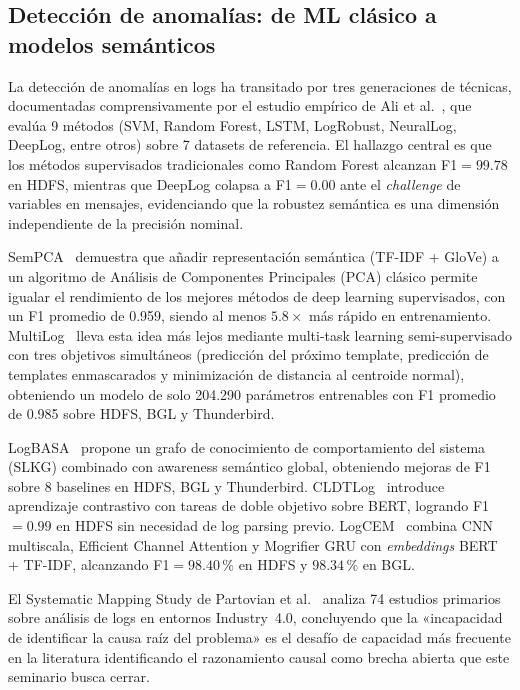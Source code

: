 \subsection{Detección de anomalías: de ML clásico a modelos semánticos}

La detección de anomalías en logs ha transitado por tres generaciones
de técnicas, documentadas comprensivamente por el estudio empírico de
Ali et al.~\cite{ali2025mlstudy}, que evalúa 9 métodos (SVM, Random Forest,
LSTM, LogRobust, NeuralLog, DeepLog, entre otros) sobre 7 datasets de
referencia. El hallazgo central es que los métodos supervisados
tradicionales como Random Forest alcanzan F1$=99.78$ en HDFS, mientras
que DeepLog colapsa a F1$=0.00$ ante el \textit{challenge} de variables en
mensajes, evidenciando que la robustez semántica es una dimensión
independiente de la precisión nominal.

SemPCA~\cite{yang2024sempca} demuestra que añadir representación
semántica (TF-IDF + GloVe) a un algoritmo de Análisis de Componentes Principales (PCA) clásico permite igualar
el rendimiento de los mejores métodos de deep learning supervisados,
con un F1 promedio de 0.959, siendo al menos $5.8\times$ más rápido
en entrenamiento. MultiLog~\cite{pham2024multilog} lleva esta idea más
lejos mediante multi-task learning semi-supervisado con tres objetivos
simultáneos (predicción del próximo template, predicción de templates
enmascarados y minimización de distancia al centroide normal), obteniendo
un modelo de solo 204.290 parámetros entrenables con F1 promedio de 0.985
sobre HDFS, BGL y Thunderbird.

LogBASA~\cite{liao2025logbasa} propone un grafo de conocimiento de comportamiento
del sistema (SLKG) combinado con awareness semántico global, obteniendo
mejoras de F1 sobre 8 baselines en HDFS, BGL y Thunderbird. CLDTLog~\cite{tian2024cldtlog}
introduce aprendizaje contrastivo con tareas de doble objetivo sobre BERT,
logrando F1$=0.99$ en HDFS sin necesidad de log parsing previo. LogCEM~\cite{xu2024semantic}
combina CNN multiscala, Efficient Channel Attention y Mogrifier GRU con
\textit{embeddings} BERT + TF-IDF, alcanzando F1$=98.40\,\%$ en HDFS y
$98.34\,\%$ en BGL.

El Systematic Mapping Study de Partovian et al.~\cite{partovian2024sms}
analiza 74 estudios primarios sobre análisis de logs en entornos
Industry~4.0, concluyendo que la «incapacidad de identificar la causa raíz del problema» es el desafío de capacidad más frecuente en la literatura identificando el razonamiento causal como brecha abierta que este seminario busca cerrar.

